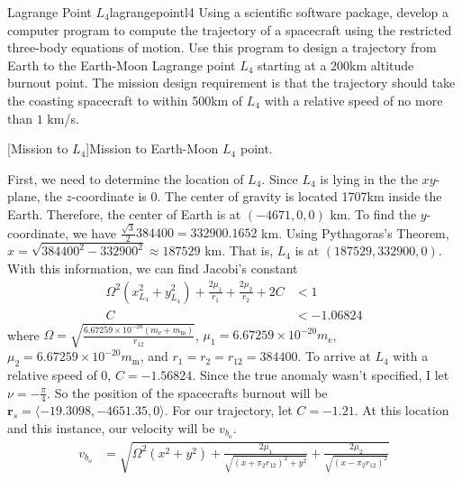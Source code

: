 \begin{examples}{Lagrange Point \(L_4\)}{lagrangepointl4}
  Using a scientific software package, develop a computer program to compute
  the trajectory of a spacecraft using the restricted three-body equations of
  motion.
  Use this program to design a trajectory from Earth to the Earth-Moon Lagrange
  point \(L_4\) starting at a 200km altitude burnout point.
  The mission design requirement is that the trajectory should take the
  coasting  spacecraft to within 500km of \(L_4\) with a relative speed of no
  more than \(1\) km/s.
  \par\smallskip
  \begin{minipage}{\linewidth}
    \centering
    
    [Mission to \(L_4\)]{Mission to Earth-Moon \(L_4\)
      point.}
    \label{earthmoonl4}
  \end{minipage}
  \par\smallskip
  First, we need to determine the location of \(L_4\).
  Since \(L_4\) is lying in the the \(xy\)-plane, the \(z\)-coordinate is 0.
  The center of gravity is located 1707km inside the Earth.
  Therefore, the center of Earth is at \((-4671,0,0)\) km.
  To find the \(y\)-coordinate, we have
  \(\frac{\sqrt{3}}{2}384400 = 332900.1652\) km.
  Using Pythagoras's Theorem, \(x = \sqrt{384400^2 - 332900^2}\approx 187529\)
  km.
  That is, \(L_4\) is at \((187529, 332900, 0)\).
  With this information, we can find Jacobi's constant
  \begin{align*}
    \varOmega^2(x_{L_4}^2 + y_{L_4}^2) + \frac{2\mu_1}{r_1} +
    \frac{2\mu_2}{r_2} + 2C & < 1\\
    C & < -1.06824
  \end{align*}
  where
  \(\varOmega = \sqrt{\frac{6.67259\times 10^{-20}(m_{\text{e}} +          
      m_{\text{m}})}{r_{12}}}\),
  \(\mu_1 = 6.67259\times 10^{-20}m_{\text{e}}\),   
  \(\mu_2 = 6.67259\times 10^{-20}m_{\text{m}}\), and
  \(r_1 = r_2 = r_{12} = 384400\).
  To arrive at \(L_4\) with a relative speed of 0, \(C = -1.56824\).
  Since the true anomaly wasn't specified, I let \(\nu = -\frac{\pi}{4}\).
  So the position of the spacecrafts burnout will be
  \(\mathbf{r}_s = \langle -19.3098,-4651.35,0\rangle\).
  For our trajectory, let \(C = -1.21\).
  At this location and this instance, our velocity will be \(v_{b_o}\).
  \begin{align*}
  v_{b_o} & = \sqrt{\varOmega^2(x^2 + y^2) + \frac{2\mu_1}{\sqrt{(x
            + \pi_2r_{12})^2 + y^2}} + \frac{2\mu_2}{\sqrt{(x - \pi_2r_{12})^2
}}}
\end{align*}
\end{examples}
